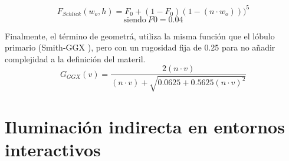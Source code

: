                 $$
                F_{Schlick}(w_o, h) = F_0 + (1 - F_0) (1 - (n\cdot{w_o})))^5
                $$
                \begin{equation}
                    \textrm{siendo}\ F0 = 0.04
                \end{equation}
                \singlespacing

                Finalmente, el t\'ermino de geometr\'a, utiliza la misma funci\'on que el l\'obulo primario (Smith-GGX \autocite{ggx}),
                pero con un rugosidad fija de 0.25 para no a\~nadir complejidad a la definici\'on del materil.\\

                \begin{equation}
                    G_{GGX}(v) = \frac
                    {2 (n \cdot{v})}
                    {(n \cdot{v}) + \sqrt{ 0.0625 + 0.5625 (n \cdot{v})^2 }}
                \end{equation}
                \singlespacing



    
    \section{Iluminaci\'on indirecta en entornos interactivos}

        
    

